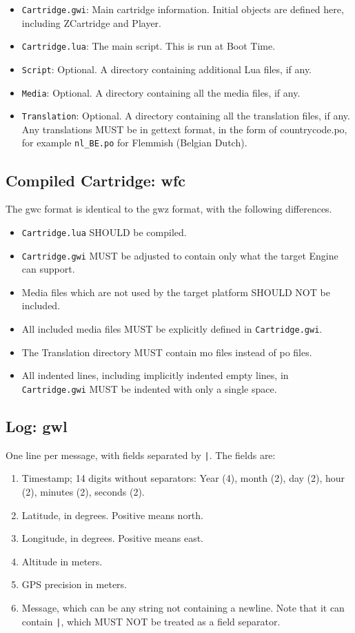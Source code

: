 \documentclass{article}
\begin{document}
\begin{itemize}
	\item \verb-Cartridge.gwi-: Main cartridge information.  Initial objects are defined here, including ZCartridge and Player.
	\item \verb-Cartridge.lua-: The main script.  This is run at Boot Time.
	\item \verb-Script-: Optional.  A directory containing additional Lua files, if any.
	\item \verb-Media-: Optional.  A directory containing all the media files, if any.
	\item \verb-Translation-: Optional.  A directory containing all the translation files, if any.  Any translations MUST be in gettext format, in the form of countrycode.po, for example \verb-nl_BE.po- for Flemmish (Belgian Dutch).
\end{itemize}

\subsection{Compiled Cartridge: wfc}
The gwc format is identical to the gwz format, with the following differences.
\begin{itemize}
	\item \verb-Cartridge.lua- SHOULD be compiled.
	\item \verb-Cartridge.gwi- MUST be adjusted to contain only what the target Engine can support.
	\item Media files which are not used by the target platform SHOULD NOT be included.
	\item All included media files MUST be explicitly defined in \verb-Cartridge.gwi-.
	\item The Translation directory MUST contain mo files instead of po files.
	\item All indented lines, including implicitly indented empty lines, in \verb-Cartridge.gwi- MUST be indented with only a single space.
\end{itemize}

\subsection{Log: gwl}
One line per message, with fields separated by \verb-|-. The fields are:
\begin{enumerate}
	\item Timestamp; 14 digits without separators: Year (4), month (2), day (2), hour (2), minutes (2), seconds (2).
	\item Latitude, in degrees. Positive means north.
	\item Longitude, in degrees. Positive means east.
	\item Altitude in meters.
	\item GPS precision in meters.
	\item Message, which can be any string not containing a newline. Note that it can contain \verb-|-, which MUST NOT be treated as a field separator.
\end{enumerate}
\end{document}
